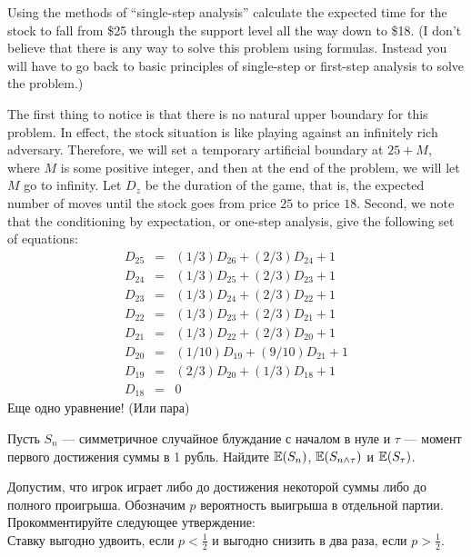 \begin{problem}
  Using the methods of ``single-step analysis'' calculate the
  expected time for the stock to fall from \$25 through the
  support level all the way down to \$18.
  (I don't believe that there is any way to solve this problem
  using formulas.  Instead you will have to go back to basic
  principles of single-step or first-step analysis to solve
  the problem.)

\begin{sol}

The first thing to notice is that there is no natural upper
boundary for this problem. In effect, the stock situation is
like playing against an infinitely rich adversary. Therefore,
we will set a temporary
artificial boundary at $25+M$, where $M$ is some
positive integer, and then at the end of the problem, we will
let $M$ go to infinity. Let $D_z$ be the duration of the game,
that is, the expected number of moves until the stock goes
from price $25$ to price $18$. Second, we note that the
conditioning by expectation, or one-step analysis, give the
following set of equations:
\begin{eqnarray*}
 D_{25} &=& (1/3) D_{26} + (2/3) D_{24} + 1  \\
 D_{24} &=& (1/3) D_{25} + (2/3) D_{23} + 1  \\
 D_{23} &=& (1/3) D_{24} + (2/3) D_{22} + 1  \\
 D_{22} &=& (1/3) D_{23} + (2/3) D_{21} + 1  \\
 D_{21} &=& (1/3) D_{22} + (2/3) D_{20} + 1  \\
 D_{20} &=& (1/10) D_{19} + (9/10) D_{21} + 1  \\
 D_{19} &=& (2/3) D_{20} + (1/3) D_{18} + 1  \\
 D_{18} &=& 0
\end{eqnarray*}
Еще одно уравнение! (Или пара)
\end{sol}
\end{problem}

\begin{problem}
Пусть $S_{n}$ — симметричное случайное блуждание с началом в нуле
и $\tau$ — момент первого достижения суммы в 1 рубль. Найдите
$\mathbb{E}(S_{n})$, $\mathbb{E}(S_{n\wedge \tau})$ и $\mathbb{E}(S_{\tau})$.

\begin{sol}

\end{sol}
\end{problem}

\begin{problem}
Допустим, что игрок играет либо до достижения некоторой суммы либо
до полного проигрыша. Обозначим $p$ вероятность выигрыша в отдельной партии. \\
Прокомментируйте следующее утверждение: \\
Ставку выгодно удвоить, если $p<\frac{1}{2}$ и выгодно снизить в
два раза, если $p>\frac{1}{2}$.

\begin{sol}

\end{sol}
\end{problem}


